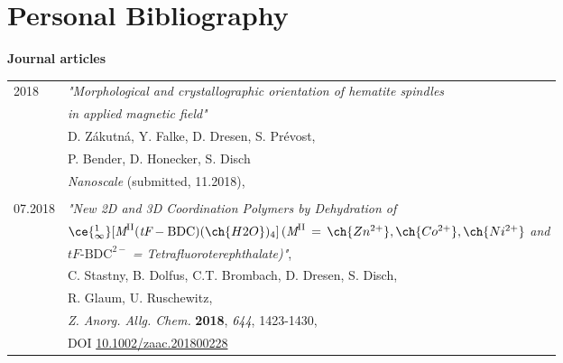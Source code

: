 \documentclass[\main/dresen_thesis.tex]{subfiles}
\begin{document}
	\section*{Personal Bibliography}

	\noindent \textbf{Journal articles}
	\begin{table}[H]
			\begin{tabular}{p{2cm}l}
				2018 			& \textit{"Morphological and crystallographic orientation of hematite spindles}\\
										  &	\textit{in applied magnetic field"}\\
											& D. Zákutná, Y. Falke, D. Dresen, S. Prévost,\\
											& P. Bender, D. Honecker, S. Disch\\
											& \textit{Nanoscale} (submitted, 11.2018),\\ \\
				07.2018 			& \textit{"New 2D and 3D Coordination Polymers by Dehydration of}\\
											& $\ce{^{1}_{\infty}} [ \textit{M}^{\mathrm{II}} (\textit{tF}‐\mathrm{BDC})(\ch{H2O})_4]\, (\textit{M}^{\mathrm{II}}\,=\, \ch{Zn^{2+}}, \ch{Co^{2+}}, \ch{Ni^{2+}}$ \textit{and}\\
											& $\textit{tF}‐\mathrm{BDC}^{2-}$ \textit{= Tetrafluoroterephthalate)"},\\
											& C. Stastny, B. Dolfus, C.T. Brombach, D. Dresen, S. Disch,\\
											& R. Glaum, U. Ruschewitz,\\
											& \textit{Z. Anorg. Allg. Chem.} \textbf{2018}, \textit{644}, 1423-1430,\\
											& DOI \href{https://doi.org/10.1002/zaac.201800228}{10.1002/zaac.201800228}
			\end{tabular}
	\end{table}

	\vspace{\baselineskip}
\end{document}
